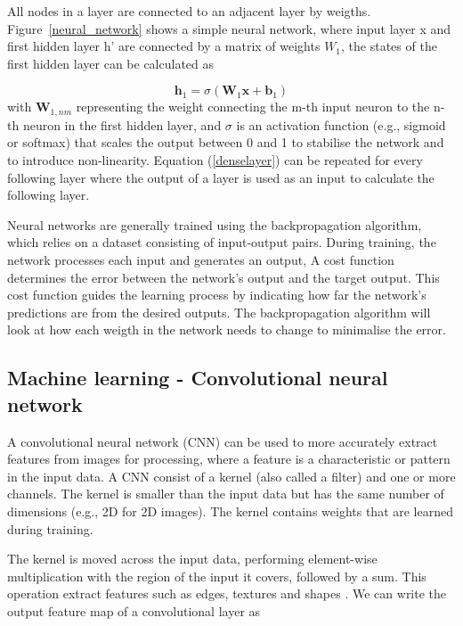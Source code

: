 \documentclass{article}
\begin{document}
All nodes in a layer are connected to an adjacent layer by weigths. Figure~\ref{neural_network} shows a simple neural network, where input layer x and first hidden layer h' are connected by a matrix of weights $W_1$, the states of the first hidden layer can be calculated as

\begin{equation}
\label{denseLayer}
\mathbf{h}_1 = \sigma(\mathbf{W}_1 \mathbf{x} + \mathbf{b}_1)
\end{equation}
with $\mathbf{W}_{1,nm}$ representing the weight connecting the m-th input neuron to the n-th neuron in the first hidden layer, and $\sigma$ is an activation function (e.g., sigmoid or softmax) that scales the output between 0 and 1 to stabilise the network and to introduce non-linearity. Equation (\ref{denselayer}) can be repeated for every following layer where the output of a layer is used as an input to calculate the following layer.

Neural networks are generally trained using the backpropagation algorithm, which relies on a dataset consisting of input-output pairs. During training, the network processes each input and generates an output, A cost function determines the error between the network's output and the target output. This cost function guides the learning process by indicating how far the network's predictions are from the desired outputs. The backpropagation algorithm will look at how each weigth in the network needs to change to minimalise the error.

\subsection{Machine learning - Convolutional neural network}

A convolutional neural network (CNN) can be used to more accurately extract features from images for processing, where a feature is a characteristic or pattern in the input data. A CNN consist of a kernel (also called a filter) and one or more channels. The kernel is smaller than the input data but has the same number of dimensions (e.g., 2D for 2D images). The kernel contains weights that are learned during training.

The kernel is moved across the input data, performing element-wise multiplication with the region of the input it covers, followed by a sum. This operation extract features such as edges, textures and shapes \citep{yamashita2018convolutional}. We can write the output feature map of a convolutional layer as
\end{document}
